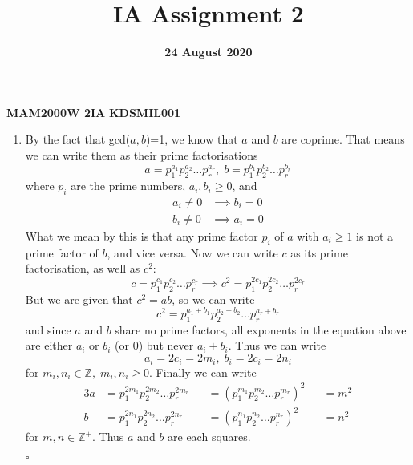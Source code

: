 \documentclass[12pt]{article}
\title{IA Assignment 2}
\date{\textbf{24 August 2020}}
\author{}
\numberwithin{equation}{section}
\numberwithin{figure}{section}
\begin{document}
    \maketitle
    \begin{center}
    \textbf{\large{MAM2000W 2IA}}\hspace{25pt}
    \textbf{\large{KDSMIL001}}
    \end{center}

    \begin{enumerate}
        \item By the fact that gcd($a,b$)=1, we know that $a$ and $b$ are coprime. That means we can 
        write them as their prime factorisations
        \begin{equation*}
            a=p_1^{a_1}p_2^{a_2}\dots p_r^{a_r},\;b=p_1^{b_1}p_2^{b_2}\dots p_r^{b_r}
        \end{equation*}
        where $p_i$ are the prime numbers, $a_i,b_i\geq 0$, and 
        \begin{align*}
            a_i\neq0&\implies b_i=0 \\
            b_i\neq0&\implies a_i=0
        \end{align*}
        What we mean by this is that any prime factor $p_i$ of $a$ with $a_i\geq1$ is not a prime factor 
        of $b$, and vice versa. \newline
        Now we can write $c$ as its prime factorisation, as well as $c^2$:
        \begin{equation*}
            c=p_1^{c_1}p_2^{c_2}\dots p_r^{c_r}\implies c^2=p_1^{2c_1}p_2^{2c_2}\dots p_r^{2c_r}
        \end{equation*}
        But we are given that $c^2=ab$, so we can write 
        \begin{equation*}
            c^2=p_1^{a_1+b_1}p_2^{a_2+b_2}\dots p_r^{a_r+b_r}
        \end{equation*}
        and since $a$ and $b$ share no prime factors, all exponents in the equation above are either 
        $a_i$ or $b_i$ (or 0) but never $a_i+b_i$. Thus we can write 
        \begin{equation*}
            a_i=2c_i=2m_i,\; b_i=2c_i=2n_i
        \end{equation*}
        for $m_i,n_i\in\mathbb{Z},\; m_i,n_i\geq0$. Finally we can write 
        \begin{alignat*}{3}
            a&=p_1^{2m_1}p_2^{2m_2}\dots p_r^{2m_r}&&=(p_1^{m_1}p_2^{m_2}\dots p_r^{m_r})^2&&=m^2 \\
            b&=p_1^{2n_1}p_2^{2n_2}\dots p_r^{2n_r}&&=(p_1^{n_1}p_2^{n_2}\dots p_r^{n_r})^2&&=n^2
        \end{alignat*}
        for $m,n\in\mathbb{Z}^+$. Thus $a$ and $b$ are each squares.
        \newline
        \begin{flushright}$\square$\end{flushright}

    \end{enumerate}
\end{document}
